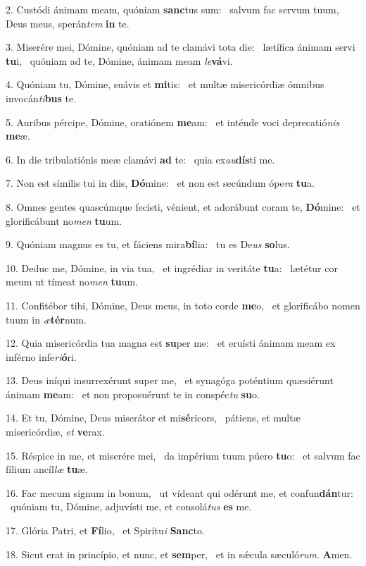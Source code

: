 2. Custódi ánimam meam, quóniam \textbf{sanc}tus sum: \ast\  salvum fac servum tuum, Deus meus, sperán\textit{tem} \textbf{in} te.\

3. Miserére mei, Dómine, quóniam ad te clamávi tota die: \dag\  lætífica ánimam servi \textbf{tu}i, \ast\  quóniam ad te, Dómine, ánimam meam \textit{le}\textbf{vá}vi.\

4. Quóniam tu, Dómine, suávis et \textbf{mi}tis: \ast\  et multæ misericórdiæ ómnibus invocán\textit{ti}\textbf{bus} te.\

5. Auribus pércipe, Dómine, oratiónem \textbf{me}am: \ast\  et inténde voci deprecatió\textit{nis} \textbf{me}æ.\

6. In die tribulatiónis meæ clamávi \textbf{ad} te: \ast\  quia ex\textit{au}\textbf{dís}ti me.\

7. Non est símilis tui in diis, \textbf{Dó}mine: \ast\  et non est secúndum ópe\textit{ra} \textbf{tu}a.\

8. Omnes gentes quascúmque fecísti, vénient, et adorábunt coram te, \textbf{Dó}mine: \ast\  et glorificábunt no\textit{men} \textbf{tu}um.\

9. Quóniam magnus es tu, et fáciens mira\textbf{bí}lia: \ast\  tu es De\textit{us} \textbf{so}lus.\

10. Deduc me, Dómine, in via tua, \dag\  et ingrédiar in veritáte \textbf{tu}a: \ast\  lætétur cor meum ut tímeat no\textit{men} \textbf{tu}um.\

11. Confitébor tibi, Dómine, Deus meus, in toto corde \textbf{me}o, \ast\  et glorificábo nomen tuum in \textit{æ}\textbf{tér}num.\

12. Quia misericórdia tua magna est \textbf{su}per me: \ast\  et eruísti ánimam meam ex inférno infe\textit{ri}\textbf{ó}ri.\

13. Deus iníqui insurrexérunt super me, \dag\  et synagóga poténtium quæsiérunt ánimam \textbf{me}am: \ast\  et non proposuérunt te in conspéc\textit{tu} \textbf{su}o.\

14. Et tu, Dómine, Deus miserátor et mi\textbf{sé}ricors, \ast\  pátiens, et multæ misericórdiæ, \textit{et} \textbf{ve}rax.\

15. Réspice in me, et miserére mei, \dag\  da impérium tuum púero \textbf{tu}o: \ast\  et salvum fac fílium ancíl\textit{læ} \textbf{tu}æ.\

16. Fac mecum signum in bonum, \dag\  ut vídeant qui odérunt me, et confun\textbf{dán}tur: \ast\  quóniam tu, Dómine, adjuvísti me, et consolá\textit{tus} \textbf{es} me.\

17. Glória Patri, et \textbf{Fí}lio, \ast\  et Spirítu\textit{i} \textbf{Sanc}to.\

18. Sicut erat in princípio, et nunc, et \textbf{sem}per, \ast\  et in sǽcula sæculó\textit{rum}. \textbf{A}men.\


